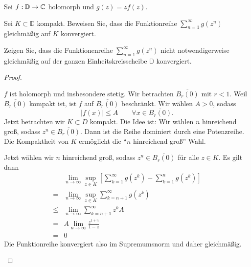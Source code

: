 \begin{Problem}
	Sei $f:\mathbb{D}\to \mathbb{C}$ holomorph und $g(z)=zf(z)$.
	\begin{parts}
	\item Sei $K\subset \mathbb{D}$ kompakt. Beweisen Sie, dass die Funktionreihe $\sum_{n=1}^\infty g(z^n)$ gleichmäßig auf $K$ konvergiert.
	\item Zeigen Sie, dass die Funktionenreihe $\sum_{n=1}^\infty g(z^n)$ nicht notwendigerweise gleichmäßig auf der ganzen Einheitskreisscheibe $\mathbb{D}$ konvergiert.
	\end{parts}
\end{Problem}

\begin{proof}
	\begin{parts}
	\item $f$ ist holomorph und insbesondere stetig. Wir betrachten $\overline{B_r(0)}$ mit $r<1$. Weil $\overline{B_r(0)}$ kompakt ist, ist $f$ auf $\overline{B_r(0)}$ beschränkt. Wir wählen $A>0$, sodass
	\[
	|f(x)|\le A\qquad \forall x\in \overline{B_r(0)}
	.\] 
	Jetzt betrachten wir $K\subset D$ kompakt. Die Idee ist: Wir wählen $n$ hinreichend groß, sodass $z^n\in \overline{B_r(0)}$. Dann ist die Reihe dominiert durch eine Potenzreihe. Die Kompaktheit von $K$ ermöglicht die ``$n$ hinreichend groß'' Wahl.

	Jetzt wählen wir $n$ hinreichend groß, sodass $z^n \in \overline{B_r(0)}$ f\"{u}r alle $z\in K$. Es gilt dann
	\begin{align*}
		&\lim_{n\to\infty}\sup_{z\in K}\left[\sum_{k=1}^\infty g(z^k)- \sum_{k=1}^n g(z^k)\right]\\
		=&\lim_{n\to\infty}\sup_{z\in K}\sum_{k=n+1}^\infty g(z^k)\\
		\le&\lim_{n\to\infty}\sum_{k=n+1}^\infty z^k A\\
		=&A \lim_{n\to\infty} \frac{z^{1+n}}{1-z}\\
		=&0
	\end{align*}
	Die Funktionreihe konvergiert also im Supremumsnorm und daher gleichmäßig.
\end{parts}
\end{proof}

